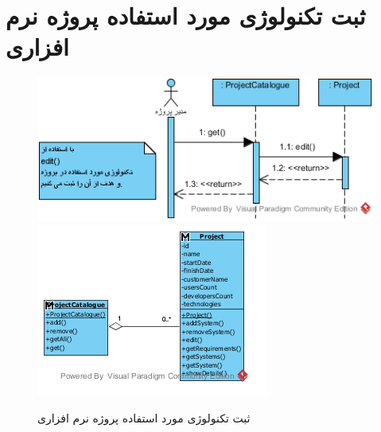 \section{ثبت تکنولوژی مورد استفاده پروژه نرم افزاری}
\begin{figure}[H]
	\centering
	\includegraphics[scale=0.7]{img/sequence-analysis/AddTechnology}
	\includegraphics[scale=0.7]{img/sequence-analysis/AddTechnologyC}
	\caption{ثبت تکنولوژی مورد استفاده پروژه نرم افزاری}
\end{figure}

